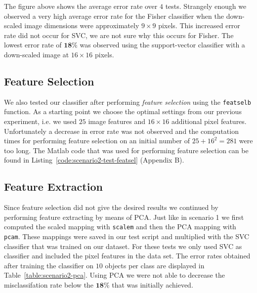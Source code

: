 \documentclass{article}
\begin{document}
\clearpage

The figure above shows the average error rate over $4$ tests. Strangely enough we observed a very high average error rate for the Fisher classifier when the down-scaled image dimensions were approximately $9 \times 9$ pixels. This increased error rate did not occur for SVC, we are not sure why this occurs for Fisher. The lowest error rate of $\mathbf{18 \%}$ was observed using the support-vector classifier with a down-scaled image at $16 \times 16$ pixels. 

\subsection{Feature Selection}

We also tested our classifier after performing \emph{feature selection} using the \texttt{featselb} function. As a starting point we choose the optimal settings from our previous experiment, i.e. we used $25$ image features and $16 \times 16$ additional pixel features. Unfortunately a decrease in error rate was not observed and the computation times for performing feature selection on an initial number of $25 + 16^2 = 281$ were too long. The Matlab code that was used for performing feature selection can be found in Listing~\ref{code:scenario2-test-featsel} (Appendix B).

\subsection{Feature Extraction}

Since feature selection did not give the desired results we continued by performing feature extracting by means of PCA. Just like in scenario 1 we first computed the scaled mapping with \texttt{scalem} and then the PCA mapping with \texttt{pcam}. These mappings were saved in our test script and multiplied with the SVC classifier that was trained on our dataset. For these tests we only used SVC as classifier and included the pixel features in the data set. The error rates obtained after training the classifier on $10$ objects per class are displayed in Table~\ref{table:scenario2-pca}. Using PCA we were not able to decrease the misclassifation rate below the $\mathbf{18 \%}$ that was initially achieved.
\end{document}
